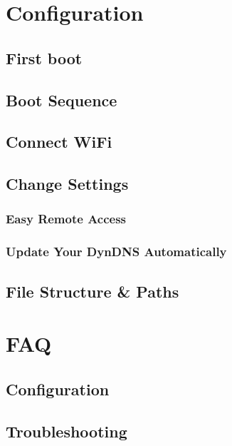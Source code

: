 \documentclass{article}
\begin{document}
\section{Configuration}
\subsection{First boot}


\subsection{Boot Sequence}


\subsection{Connect WiFi}


\subsection{Change Settings}
\subsubsection{Easy Remote Access}

\subsubsection{Update Your DynDNS Automatically}


\subsection{File Structure \& Paths}



\section{FAQ}
\subsection{Configuration}


\subsection{Troubleshooting}

\end{document}
